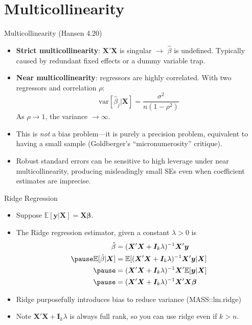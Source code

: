 \documentclass[aspectratio=169]{beamer}
\numberwithin{equation}{section}
\begin{document}
 \section{Multicollinearity}
 
 \begin{frame}{Multicollinearity (Hansen 4.20)}
\begin{itemize}
\item \textbf{Strict multicollinearity}: $\bm{X'\!X}$ is singular $\rightarrow$ $\hat{\beta}$ is undefined.  Typically caused by redundant fixed effects or a dummy variable trap. \pause
\item \textbf{Near multicollinearity}: regressors are highly correlated.  With two regressors and correlation $\rho$:
$$\text{var}[\hat{\beta}_j|\bm{X}]=\frac{\sigma^2}{n(1-\rho^2)}$$
As $\rho\to 1$, the variance $\to\infty$.  \pause
\item This is \emph{not} a bias problem---it is purely a precision problem, equivalent to having a small sample (Goldberger's ``micronumerosity'' critique). \pause
\item Robust standard errors can be \alert{sensitive to high leverage} under near multicollinearity, producing misleadingly small SEs even when coefficient estimates are imprecise.
\end{itemize}
 \end{frame}


 \begin{frame}{Ridge Regression}
\begin{itemize}
\item Suppose $\mathbb{E}[\bm{y}|\bm{X}]=\bm{X\beta}$.
\item The Ridge regression estimator, given a constant $\lambda>0$ is 
\begin{align*}
\hat{\beta}&=(\bm{X}'\bm{X}+\bm{I}_k \lambda)^{-1}\bm{X}'\bm{y}\\ \pause
\mathbb{E}[\hat{\beta}|\bm{X}]&=\mathbb{E}[(\bm{X}'\bm{X}+\bm{I}_k \lambda)^{-1}\bm{X}'\bm{y}|\bm{X}]\\ \pause
&=(\bm{X}'\bm{X}+\bm{I}_k \lambda)^{-1}\bm{X}'\mathbb{E}[\bm{y}|\bm{X}]\\ \pause
&=(\bm{X}'\bm{X}+\bm{I}_k \lambda)^{-1}\bm{X}'\bm{X\beta}
\end{align*}
\item Ridge purposefully introduces bias to reduce variance (MASS::lm.ridge)
\item Note $\bm{X}'\bm{X}+\bm{I}_k \lambda$ is always full rank, so you can use ridge even if $k>n$.
\end{itemize}
 \end{frame}
 
\end{document}
